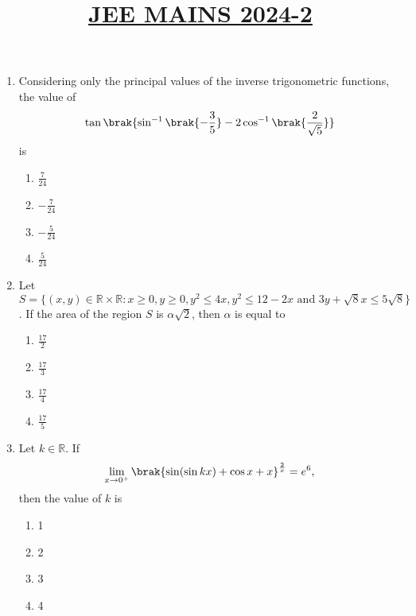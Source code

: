 \documentclass[12pt,a4paper]{article}
\title{\underline{\textbf{JEE MAINS 2024-2}}}
\date{}
\begin{document}
\maketitle
\begin{enumerate}
		\item Considering only the principal values of the inverse trigonometric functions, the value of  
\[
    \tan \brak{ \sin^{-1} \brak{ -\frac{3}{5} } - 2\cos^{-1} \brak{ \frac{2}{\sqrt{5}} } }
\]
    is  
    \begin{enumerate}[label=\Alph*.]
        \item $\frac{7}{24}$
        \item $-\frac{7}{24}$
        \item $-\frac{5}{24}$
        \item $\frac{5}{24}$
    \end{enumerate}

    \item Let $ S = \{(x,y) \in \mathbb{R} \times \mathbb{R} : x \geq 0, y \geq 0, y^2 \leq 4x, y^2 \leq 12 - 2x \text{ and } 3y + \sqrt{8}x \leq 5\sqrt{8} \} $.  
    If the area of the region $ S $ is $ \alpha \sqrt{2} $, then $ \alpha $ is equal to  
    \begin{enumerate}[label=\Alph*.]
        \item $\frac{17}{2}$
        \item $\frac{17}{3}$
        \item $\frac{17}{4}$
        \item $\frac{17}{5}$
    \end{enumerate}

    \item Let $ k \in \mathbb{R} $. If  
\[
    \lim_{x \to 0^+} \brak{ \sin(\sin kx) + \cos x + x }^{\frac{2}{x}} = e^6,
\]
    then the value of $ k $ is  
    \begin{enumerate}[label=\Alph*.]
        \item 1
        \item 2
        \item 3
        \item 4
    \end{enumerate}


\end{enumerate}
\end{document}

